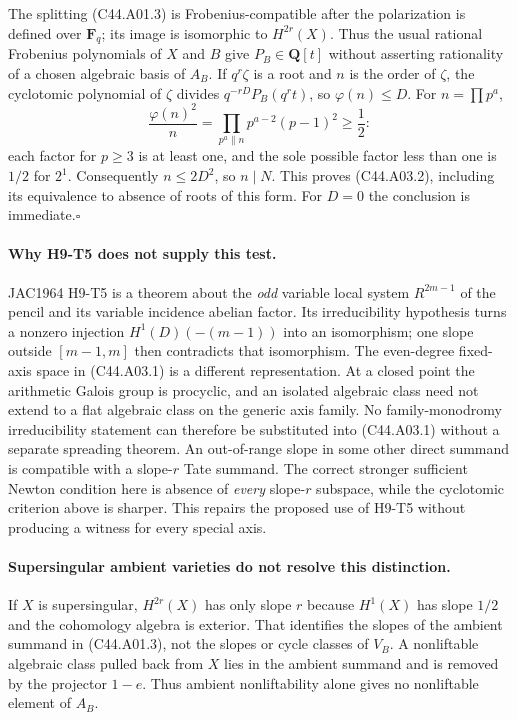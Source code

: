 \documentclass[11pt]{article}
\theoremstyle{remark}\newtheorem{remark}[theorem]{Remark}
\begin{document}
The splitting (C44.A01.3) is Frobenius-compatible after the
polarization is defined over $\mathbf F_q$; its image is isomorphic
to $H^{2r}(X)$. Thus the usual rational Frobenius polynomials of
$X$ and $B$ give $P_B\in\mathbf Q[t]$ without asserting
rationality of a chosen algebraic basis of $A_B$.
If $q^r\zeta$ is a root and $n$ is the order of $\zeta$, the
cyclotomic polynomial of $\zeta$ divides
$q^{-rD}P_B(q^rt)$, so $\varphi(n)\le D$.
For $n=\prod p^a$,
\[
 \frac{\varphi(n)^2}{n}=\prod_{p^a\parallel n}p^{a-2}(p-1)^2
 \ge\frac12:
\]
each factor for $p\ge3$ is at least one, and the sole possible
factor less than one is $1/2$ for $2^1$. Consequently $n\le2D^2$,
so $n\mid N$. This proves (C44.A03.2), including its equivalence
to absence of roots of this form. For $D=0$ the conclusion is
immediate.\hfill$\square$

\paragraph{Why H9-T5 does not supply this test.}
JAC1964 H9-T5 is a theorem about the \emph{odd} variable local
system $R^{2m-1}$ of the pencil and its variable incidence abelian
factor. Its irreducibility hypothesis turns a nonzero injection
$H^1(D)(-(m-1))$ into an isomorphism; one slope outside
$[m-1,m]$ then contradicts that isomorphism. The even-degree
fixed-axis space in (C44.A03.1) is a different representation.
At a closed point the arithmetic Galois group is procyclic, and
an isolated algebraic class need not extend to a flat algebraic
class on the generic axis family. No family-monodromy
irreducibility statement can therefore be substituted into
(C44.A03.1) without a separate spreading theorem.
An out-of-range slope in some other direct summand is compatible
with a slope-$r$ Tate summand. The correct stronger sufficient
Newton condition here is absence of \emph{every} slope-$r$
subspace, while the cyclotomic criterion above is sharper.
This repairs the proposed use of H9-T5 without producing a
witness for every special axis.

\paragraph{Supersingular ambient varieties do not resolve this distinction.}
If $X$ is supersingular, $H^{2r}(X)$ has only slope $r$ because
$H^1(X)$ has slope $1/2$ and the cohomology algebra is exterior.
That identifies the slopes of the ambient summand in
(C44.A01.3), not the slopes or cycle classes of $V_B$.
A nonliftable algebraic class pulled back from $X$ lies in the
ambient summand and is removed by the projector $1-e$. Thus
ambient nonliftability alone gives no nonliftable element of
$A_B$.
\end{document}
